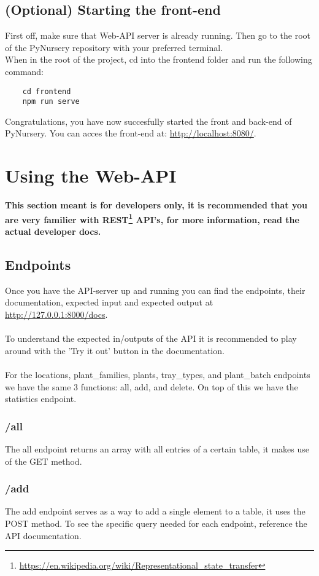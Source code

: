 \documentclass{article}
\begin{document}
\subsection{(Optional) Starting the front-end}
First off, make sure that Web-API server is already running. Then go to the root of the PyNursery repository with your preferred terminal.\\
When in the root of the project, cd into the frontend folder and run the following command:
\begin{verbatim}
    cd frontend
    npm run serve
\end{verbatim}
Congratulations, you have now succesfully started the front and back-end of PyNursery. You can acces the front-end at: \url{http://localhost:8080/}.
\newpage
\section{Using the Web-API}
\begin{center}
    \textbf{This section meant is for developers only, it is recommended that you are very familier with REST\footnote{\url{https://en.wikipedia.org/wiki/Representational_state_transfer}} API's, for more information, read the actual developer docs.}
\end{center}

\subsection{Endpoints}
Once you have the API-server up and running you can find the endpoints, their documentation, expected input and expected output at \url{http://127.0.0.1:8000/docs}.\\\\
To understand the expected in/outputs of the API it is recommended to play around with the 'Try it out' button in the documentation.\\\\
For the locations, plant\_families, plants, tray\_types, and plant\_batch endpoints we have the same 3 functions: all, add, and delete. On top of this we have the statistics endpoint.

\subsubsection{/all}
The all endpoint returns an array with all entries of a certain table, it makes use of the GET method.

\subsubsection{/add}
The add endpoint serves as a way to add a single element to a table, it uses the POST method. To see the specific query needed for each endpoint, reference the API documentation.
\end{document}
